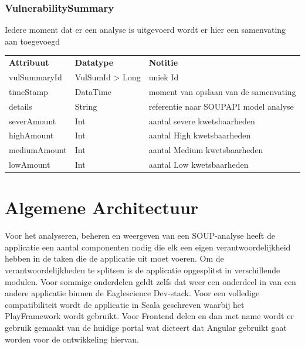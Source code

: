 \subsubsection{VulnerabilitySummary}\label{subsubsec:portalVulSum}
Iedere moment dat er een analyse is uitgevoerd wordt er hier een samenvating aan toegevoegd

\begin{tabular}{lll}
    \textbf{Attribuut} & \textbf{Datatype} & \textbf{Notitie}\\
    vulSummaryId & VulSumId > Long & uniek Id\\
    timeStamp & DataTime & moment van opslaan van de samenvating\\
    details & String & referentie naar SOUPAPI model analyse\\
    severAmount & Int & aantal severe kwetsbaarheden\\
    highAmount & Int & aantal High kwetsbaarheden\\
    mediumAmount & Int & aantal Medium kwetsbaarheden\\
    lowAmount & Int & aantal Low kwetsbaarheden\\
\end{tabular}

\section{Algemene Architectuur}\label{sec:algemene-architectuur}

Voor het analyseren, beheren en weergeven van een SOUP-analyse heeft de applicatie een aantal componenten nodig die elk een eigen verantwoordelijkheid hebben in de taken die de applicatie uit moet voeren. Om de verantwoordelijkheden te splitsen is de applicatie opgesplitst in verschillende modulen. Voor sommige onderdelen geldt zelfs dat weer een onderdeel in van een andere applicatie binnen de Eaglescience Dev-stack. Voor een volledige compatibiliteit wordt de applicatie in Scala geschreven waarbij het PlayFramework wordt gebruikt. Voor Frontend delen en dan met name wordt er gebruik gemaakt van de huidige portal wat dicteert dat Angular gebruikt gaat worden voor de ontwikkeling hiervan.


